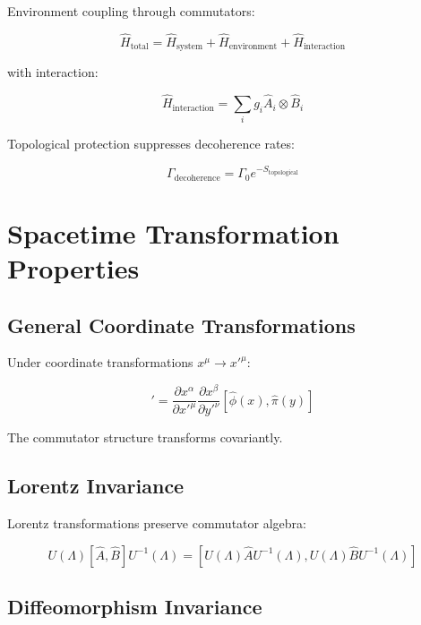 \documentclass[12pt,a4paper]{article}
\begin{document}
Environment coupling through commutators:

\begin{equation}
\hat{H}_{\text{total}} = \hat{H}_{\text{system}} + \hat{H}_{\text{environment}} + \hat{H}_{\text{interaction}}
\end{equation}

with interaction:

\begin{equation}
\hat{H}_{\text{interaction}} = \sum_i g_i \hat{A}_i \otimes \hat{B}_i
\end{equation}

Topological protection suppresses decoherence rates:

\begin{equation}
\Gamma_{\text{decoherence}} = \Gamma_0 e^{-S_{\text{topological}}}
\end{equation}

\section{Spacetime Transformation Properties}

\subsection{General Coordinate Transformations}

Under coordinate transformations $x^\mu \rightarrow x'^\mu$:

\begin{equation}
[\hat{\phi}(x), \hat{\pi}(y)]' = \frac{\partial x^\alpha}{\partial x'^\mu} \frac{\partial x^\beta}{\partial y'^\nu} [\hat{\phi}(x), \hat{\pi}(y)]
\end{equation}

The commutator structure transforms covariantly.

\subsection{Lorentz Invariance}

Lorentz transformations preserve commutator algebra:

\begin{equation}
U(\Lambda) [\hat{A}, \hat{B}] U^{-1}(\Lambda) = [U(\Lambda) \hat{A} U^{-1}(\Lambda), U(\Lambda) \hat{B} U^{-1}(\Lambda)]
\end{equation}

\subsection{Diffeomorphism Invariance}
\end{document}

